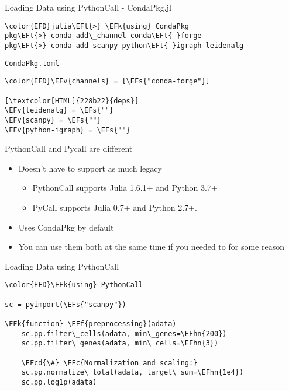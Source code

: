 \documentclass[bigger]{beamer}
\newcommand{\EFc}[1]{\textcolor{EFc}{#1}} %
\newcommand{\EFcd}[1]{\textcolor{EFcd}{#1}} %
\newcommand{\EFs}[1]{\textcolor{EFs}{#1}} %
\newcommand{\EFk}[1]{\textcolor{EFk}{#1}} %
\newcommand{\EFf}[1]{\textcolor{EFf}{#1}} %
\newcommand{\EFv}[1]{\textcolor{EFv}{#1}} %
\newcommand{\EFt}[1]{\textcolor{EFt}{#1}} %
\newcommand{\EFhn}[1]{\textcolor{EFhn}{\textbf{#1}}} %
\begin{document}
\begin{frame}[label={sec:org8d03c64},fragile]{Loading Data using PythonCall - CondaPkg.jl}
 \begin{Code}
\begin{Verbatim}
\color{EFD}julia\EFt{>} \EFk{using} CondaPkg
pkg\EFt{>} conda add\_channel conda\EFt{-}forge
pkg\EFt{>} conda add scanpy python\EFt{-}igraph leidenalg
\end{Verbatim}
\end{Code}

\texttt{CondaPkg.toml}
\begin{Code}
\begin{Verbatim}
\color{EFD}\EFv{channels} = [\EFs{"conda-forge"}]

[\textcolor[HTML]{228b22}{deps}]
\EFv{leidenalg} = \EFs{""}
\EFv{scanpy} = \EFs{""}
\EFv{python-igraph} = \EFs{""}
\end{Verbatim}
\end{Code}
\end{frame}

\begin{frame}[label={sec:org41bbce8}]{PythonCall and Pycall are different}
\begin{itemize}
\item Doesn't have to support as much legacy
\begin{itemize}
\item PythonCall supports Julia 1.6.1+ and Python 3.7+
\item PyCall supports Julia 0.7+ and Python 2.7+.
\end{itemize}
\item Uses CondaPkg by default
\item You can use them both at the same time if you needed to for some reason
\end{itemize}
\end{frame}

\begin{frame}[label={sec:orgc4e8357},fragile]{Loading Data using PythonCall}
 \begin{Code}
\begin{Verbatim}
\color{EFD}\EFk{using} PythonCall

sc = pyimport(\EFs{"scanpy"})

\EFk{function} \EFf{preprocessing}(adata)
    sc.pp.filter\_cells(adata, min\_genes=\EFhn{200})
    sc.pp.filter\_genes(adata, min\_cells=\EFhn{3})

    \EFcd{\#} \EFc{Normalization and scaling:}
    sc.pp.normalize\_total(adata, target\_sum=\EFhn{1e4})
    sc.pp.log1p(adata)
\end{Verbatim}
\end{Code}
\end{frame}
\end{document}
